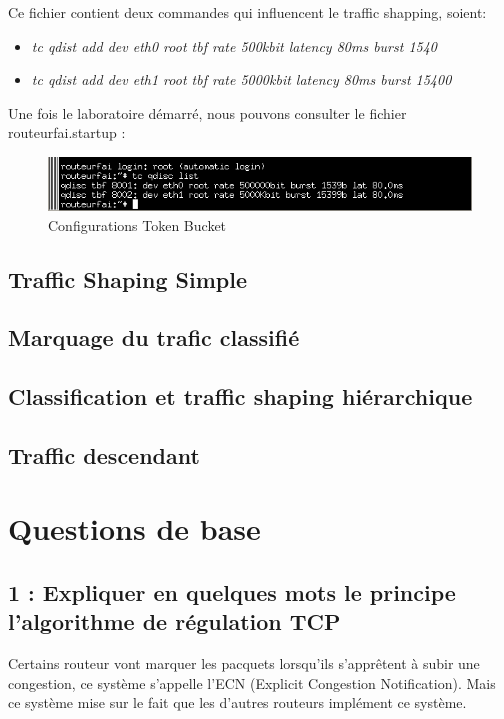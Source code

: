 \documentclass{article}
\begin{document}
Ce fichier contient deux commandes qui influencent le traffic shapping, soient:
\begin{itemize}
\item \textit{tc qdist add dev eth0 root tbf rate 500kbit latency 80ms burst 1540}
\item \textit{tc qdist add dev eth1 root tbf rate 5000kbit latency 80ms burst 15400}
\end{itemize}

Une fois le laboratoire démarré, nous pouvons consulter le fichier routeurfai.startup :
\begin{figure}[h]
  \centering
  \includegraphics[width=\linewidth]{./captures/3-TokenBucket.png}
  \caption{Configurations Token Bucket}
  \label{fig:token-bucket}
\end{figure}


\subsection{Traffic Shaping Simple}

\subsection{Marquage du trafic classifié}

\subsection{Classification et traffic shaping hiérarchique}

\subsection{Traffic descendant}

\section{Questions de base}

\subsection*{1 : Expliquer en quelques mots le principe l'algorithme de régulation TCP}

Certains routeur vont marquer les pacquets lorsqu'ils s'apprêtent à subir une congestion, ce système s'appelle l'ECN (Explicit Congestion Notification). Mais ce système mise sur le fait que les d'autres routeurs implément ce système. \cite{cours}\\
\end{document}
